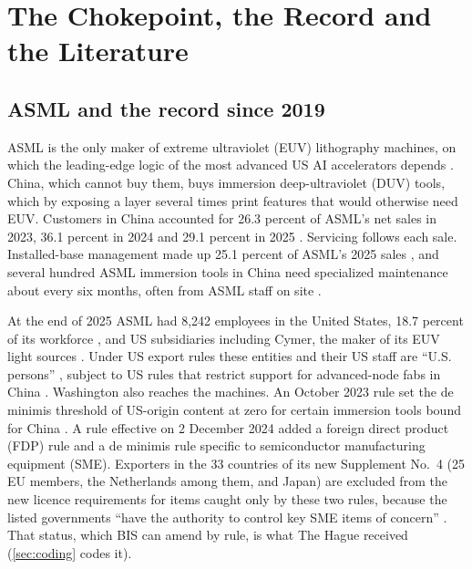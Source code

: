 \section{The Chokepoint, the Record and the Literature}\label{sec:context}

\subsection{ASML and the record since 2019}\label{sec:background}

ASML is the only maker of extreme ultraviolet (EUV) lithography machines, on which the leading-edge logic of the most advanced US AI accelerators depends \citep{miller2022chip, asml2026annual}. China, which cannot buy them, buys immersion deep-ultraviolet (DUV) tools, which by exposing a layer several times print features that would otherwise need EUV. Customers in China accounted for 26.3 percent of ASML's net sales in 2023, 36.1 percent in 2024 and 29.1 percent in 2025 \citep{asml2026annual}. Servicing follows each sale. Installed-base management made up 25.1 percent of ASML's 2025 sales \citep{asml2026annual}, and several hundred ASML immersion tools in China need specialized maintenance about every six months, often from ASML staff on site \citep{aei2026lithography}.

At the end of 2025 ASML had 8,242 employees in the United States, 18.7 percent of its workforce \citep{asml2026annual}, and US subsidiaries including Cymer, the maker of its EUV light sources \citep{asml2026subsidiaries}. Under US export rules these entities and their US staff are ``U.S. persons'' \citep{ecfr2026usperson}, subject to US rules that restrict support for advanced-node fabs in China \citep{asml2026annual}. Washington also reaches the machines. An October 2023 rule set the de minimis threshold of US-origin content at zero for certain immersion tools bound for China \citep{ecfr7344, bis2023sme}. A rule effective on 2 December 2024 added a foreign direct product (FDP) rule and a de minimis rule specific to semiconductor manufacturing equipment (SME). Exporters in the 33 countries of its new Supplement No.~4 (25 EU members, the Netherlands among them, and Japan) are excluded from the new licence requirements for items caught only by these two rules, because the listed governments ``have the authority to control key SME items of concern'' \citep{bis2024fdpr}. That status, which BIS can amend by rule, is what The Hague received (\cref{sec:coding} codes it).

